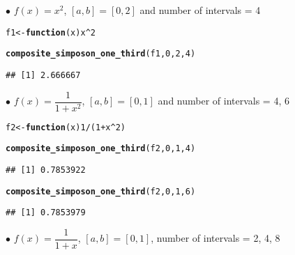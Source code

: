 \documentclass[11pt, a4paper]{article}\usepackage[]{graphicx}\usepackage[]{xcolor}
\makeatletter
\newcommand{\hlnum}[1]{\textcolor[rgb]{0.686,0.059,0.569}{#1}}%
\newcommand{\hlopt}[1]{\textcolor[rgb]{0,0,0}{#1}}%
\newcommand{\hldef}[1]{\textcolor[rgb]{0.345,0.345,0.345}{#1}}%
\newcommand{\hlkwa}[1]{\textcolor[rgb]{0.161,0.373,0.58}{\textbf{#1}}}%
\newcommand{\hlkwb}[1]{\textcolor[rgb]{0.69,0.353,0.396}{#1}}%
\newcommand{\hlkwc}[1]{\textcolor[rgb]{0.333,0.667,0.333}{#1}}%
\newcommand{\hlkwd}[1]{\textcolor[rgb]{0.737,0.353,0.396}{\textbf{#1}}}%
\newenvironment{kframe}{%
 \def\at@end@of@kframe{}%
 \ifinner\ifhmode%
  \def\at@end@of@kframe{\end{minipage}}%
  \begin{minipage}{\columnwidth}%
 \fi\fi%
 \def\FrameCommand##1{\hskip\@totalleftmargin \hskip-\fboxsep
 \colorbox{shadecolor}{##1}\hskip-\fboxsep
     \hskip-\linewidth \hskip-\@totalleftmargin \hskip\columnwidth}%
 \MakeFramed {\advance\hsize-\width
   \@totalleftmargin\z@ \linewidth\hsize
   \@setminipage}}%
 {\par\unskip\endMakeFramed%
 \at@end@of@kframe}
\newenvironment{knitrout}{}{} %
\makeatother
\begin{document}
$\bullet$ $f(x) = x^2$, $[a, b] = [0, 2]$ and number of intervals = 4

\begin{knitrout}
\color{fgcolor}\begin{kframe}
\begin{alltt}
\hldef{f1} \hlkwb{<-} \hlkwa{function}\hldef{(}\hlkwc{x}\hldef{) x}\hlopt{^}\hlnum{2}

\hlkwd{composite_simposon_one_third}\hldef{(f1,} \hlnum{0}\hldef{,} \hlnum{2}\hldef{,} \hlnum{4}\hldef{)}
\end{alltt}
\begin{verbatim}
## [1] 2.666667
\end{verbatim}
\end{kframe}
\end{knitrout}

$\bullet$ $f(x) = \dfrac{1}{1+x^2}$, $[a, b] = [0, 1]$ and number of intervals = 4, 6

\begin{knitrout}
\color{fgcolor}\begin{kframe}
\begin{alltt}
\hldef{f2} \hlkwb{<-} \hlkwa{function}\hldef{(}\hlkwc{x}\hldef{)} \hlnum{1} \hlopt{/} \hldef{(}\hlnum{1} \hlopt{+} \hldef{x}\hlopt{^}\hlnum{2}\hldef{)}

\hlkwd{composite_simposon_one_third}\hldef{(f2,} \hlnum{0}\hldef{,} \hlnum{1}\hldef{,} \hlnum{4}\hldef{)}
\end{alltt}
\begin{verbatim}
## [1] 0.7853922
\end{verbatim}
\end{kframe}
\end{knitrout}

\begin{knitrout}
\color{fgcolor}\begin{kframe}
\begin{alltt}
\hlkwd{composite_simposon_one_third}\hldef{(f2,} \hlnum{0}\hldef{,} \hlnum{1}\hldef{,} \hlnum{6}\hldef{)}
\end{alltt}
\begin{verbatim}
## [1] 0.7853979
\end{verbatim}
\end{kframe}
\end{knitrout}

$\bullet$ $f(x) = \dfrac{1}{1+x}$, $[a, b] = [0, 1]$, number of intervals = 2, 4, 8
\end{document}
